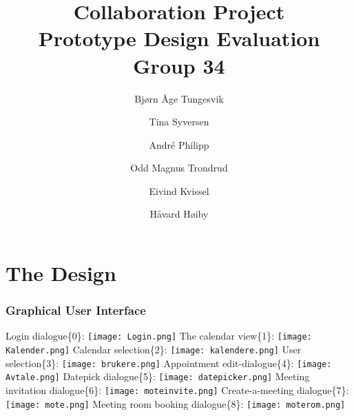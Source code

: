 \documentclass{article}
\begin{document}
\begin{titlepage}
\title{Collaboration Project\\
\textbf{Prototype Design Evaluation}\\
Group 34}
\author{Bj\o rn \AA ge Tungesvik\and Tina Syversen\and Andr\'e Philipp\and Odd Magnus Trondrud\and Eivind Kvissel\and H\aa vard H\o iby}
\maketitle
\end{titlepage}
\newpage

\part{The Design}

\section{Graphical User Interface}

Login dialogue\{0\}:\newline
\texttt{[image: Login.png]}\newline
The calendar view\{1\}: \newline
\texttt{[image: Kalender.png]}\newline
Calendar selection\{2\}: \newline
\texttt{[image: kalendere.png]}\newline
User selection\{3\}:\newline
\texttt{[image: brukere.png]}\newline
Appointment edit-dialogue\{4\}: \newline
\texttt{[image: Avtale.png]}\newline
Datepick dialogue\{5\}: \newline
\texttt{[image: datepicker.png]}\newline
Meeting invitation dialogue\{6\}: \newline
\texttt{[image: moteinvite.png]}\newline
Create-a-meeting dialogue\{7\}: \newline
\texttt{[image: mote.png]}\newline
Meeting room booking dialogue\{8\}: \newline
\texttt{[image: moterom.png]}
\end{document}
